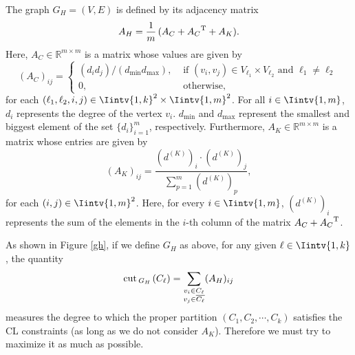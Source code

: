 \begin{definition}
The graph $G_H = (V,E)$ is defined by its adjacency matrix
   \begin{equation}\label{ah}
      A_H = \frac{1}{m} \, (A_C + {A_C}^{\rm T} + A_K).
   \end{equation}
   Here, $A_C \in \mathbb{R}^{m \times m}$ is a matrix whose values are given by
   \begin{equation}
      (A_C)_{ij} = 
      \begin{cases}
      (d_i d_j)/(d_{\min} d_{\max}), & \text{ if $(v_i, v_j) \in V_{\ell_1} \times V_{\ell_2}$ and $\ell_1 \ne \ell_2$} \\
         0, & \text{ otherwise,}
      \end{cases}
   \end{equation}
   for each $(\ell_1, \ell_2, i, j) \in \Iintv{1,k}^2 \times \Iintv{1,m}^2$. 
   For all $i \in \Iintv{1,m}$, $d_i$ represents the degree of the vertex $v_i$. $d_{\min}$ and $d_{\max}$ represent the smallest and biggest element of the set $\{ d_i \}_{i=1}^m$, respectively.
   Furthermore, $A_K \in \mathbb{R}^{m \times m}$ is a matrix whose entries are given by 
   \begin{equation}
      (A_K)_{ij} = \frac{  \left( d^{(K)} \right) _i \cdot \left( d^{(K)} \right) _j }{ \sum_{p = 1}^m (d^{(K)})_p },
   \end{equation}
   for each $(i,j) \in \Iintv{1,m}^2$. Here, for every $i \in \Iintv{1,m}$, $\left( d^{(K)} \right) _i$ represents the sum of the elements in the $i$-th column of the matrix $A_C + {A_C}^{\rm T}$.
\end{definition}

As shown in Figure \vref{gh}, if we define $G_H$ as above, for any given $\ell \in \Iintv{1,k}$, the quantity
\begin{equation}
   \operatorname{cut\,} _{G_H \,} (C_{\ell}) = \sum_{\substack{v_i \in C_{\ell} \\ v_j \in \overline{C_{\ell}}}} (A_H)_{ij} 
\end{equation}
measures the degree to which the proper partition $(C_1, C_2, \cdots, C_k)$ satisfies the CL constraints (as long as we do not consider $A_K$). 
Therefore we must try to maximize it as much as possible.

